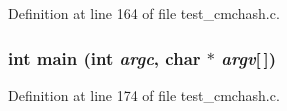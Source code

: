 Definition at line 164 of file test\_\-cmchash.c.
\subsubsection[{main}]{\setlength{\rightskip}{0pt plus 5cm}int main (int {\em argc}, \/  char $\ast$ {\em argv}[$\,$])}\label{test__cmchash_8c_0ddf1224851353fc92bfbff6f499fa97}




Definition at line 174 of file test\_\-cmchash.c.